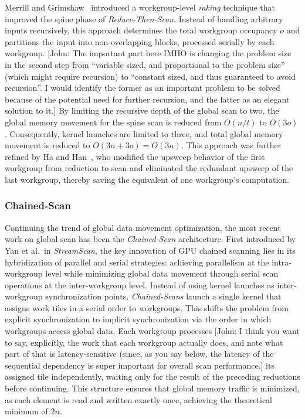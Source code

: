 \documentclass[sigconf]{acmart}
\newcommand{\john}[1]{{\footnotesize\color{cyan}[John: #1]}}
\begin{document}
Merrill and Grimshaw~\cite{} introduced a workgroup-level \emph{raking} technique that improved the spine phase of \emph{Reduce-Then-Scan}. Instead of handling arbitrary inputs recursively, this approach determines the total workgroup occupancy $o$ and partitions the input into non-overlapping blocks, processed serially by each workgroup. \john{The important part here IMHO is changing the problem size in the second step from ``variable sized, and proportional to the problem size'' (which might require recursion) to ``constant sized, and thus guaranteed to avoid recursion''. I would identify the former as an important problem to be solved because of the potential need for further recursion, and the latter as an elegant solution to it.} By limiting the recursive depth of the global scan to two, the global memory movement for the spine scan is reduced from $O(n/t)$ to $O(3o)$. Consequently, kernel launches are limited to three, and total global memory movement is reduced to $O(3n + 3o) = O(3n)$. This approach was further refined by Ha and Han~\cite{}, who modified the upsweep behavior of the first workgroup from reduction to scan and eliminated the redundant upsweep of the last workgroup, thereby saving the equivalent of one workgroup's computation.

\subsubsection{Chained-Scan}
Continuing the trend of global data movement optimization, the most recent work on global scan has been the \emph{Chained-Scan} architecture. First introduced by Yan et al.\ in \emph{StreamScan}, the key innovation of GPU chained scanning lies in its hybridization of parallel and serial strategies: achieving parallelism at the intra-workgroup level while minimizing global data movement through serial scan operations at the inter-workgroup level. Instead of using kernel launches as inter-workgroup synchronization points, \emph{Chained-Scans} launch a single kernel that assigns work tiles in a serial order to workgroups. This shifts the problem from explicit synchronization to implicit synchronization via the order in which workgroups access global data. Each workgroup processes \john{I think you want to say, explicitly, the work that each workgroup actually does, and note what part of that is latency-sensitive (since, as you say below, the latency of the sequential dependency is super important for overall scan performance.} its assigned tile independently, waiting only for the result of the preceding reductions before continuing. This structure ensures that global memory traffic is minimized, as each element is read and written exactly once, achieving the theoretical minimum of $2n$.
\end{document}
